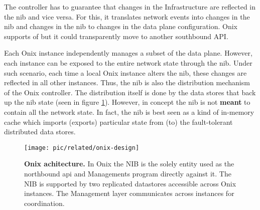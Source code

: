 The controller  has to guarantee that changes in the Infrastructure are reflected in the \gls{nib} and vice versa. 
For this, it translates network events into changes in the \gls{nib} and changes in the \gls{nib} to changes in the data plane configuration. 
Onix supports  \gls{of} but it could transparently move to another southbound API. 

Each Onix instance independently manages a subset of the data plane. 
However, each instance can be exposed to the entire network state through  the \gls{nib}.  
Under such scenario, each time a local Onix instance alters the \gls{nib}, these changes are reflected in all other instances. 
Thus, the \gls{nib} is also the distribution mechanism of the Onix controller. 
The distribution itself is done by the data stores that back up  the \gls{nib} state (seen in figure \ref{fig:onix-design}).
However, in concept the \gls{nib} is not \textbf{meant} to contain all the network state. 
In fact, the \gls{nib} is best seen as a kind of in-memory cache which imports (exports) particular state from  (to) the fault-tolerant distributed data stores. 

\begin{figure}[ht]
  \centering 
  \texttt{[image: pic/related/onix-design]}
  \caption[Onix architecture] {\textbf{Onix achitecture.} In Onix the NIB is the
    solely entity used as the northbound api and Managements program
    directly against it. The NIB is supported by
    two replicated datastores accessible across Onix instances.  The
    Management layer communicates across instances for coordination.}
  \label{fig:onix-design}
\end{figure}


